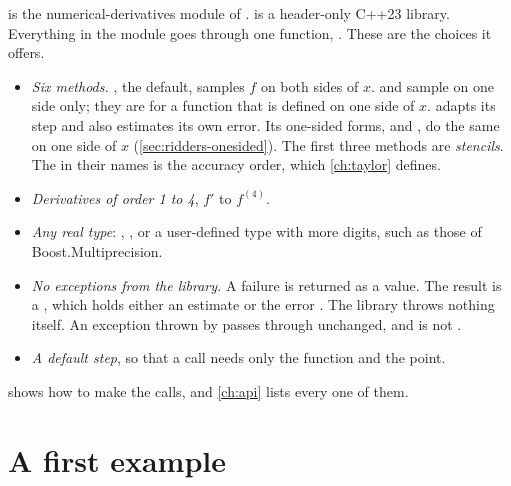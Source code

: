  is the numerical-derivatives module of \nxx. \nxx{} is a header-only C++23
library. Everything in the module goes through one function, . These are the
choices it offers.
\begin{itemize}
  \item \emph{Six methods.} , the default, samples $f$ on both sides of $x$.  and
     sample on one side only; they are for a function that is defined on one side of $x$.
     adapts its step and also estimates its own error. Its one-sided forms,  and
    , do the same on one side of $x$ (\cref{sec:ridders-onesided}). The first three methods
    are \emph{stencils}. The  in their names is
    the accuracy order, which \cref{ch:taylor} defines.
  \item \emph{Derivatives of order 1 to 4}, $f'$ to $f^{(4)}$.
  \item \emph{Any real type}: , , or a user-defined type with more digits, such as those
    of Boost.Multiprecision.
  \item \emph{No exceptions from the library.} A failure is returned as a value. The result is a
    , which holds either an estimate or the error . The library throws nothing
    itself. An exception thrown by  passes through unchanged, and  is not
    .
  \item \emph{A default step}, so that a call needs only the function and the point.
\end{itemize}
 shows how to make the calls, and \cref{ch:api} lists every one of them.

\section{A first example}\label{sec:why-first}

